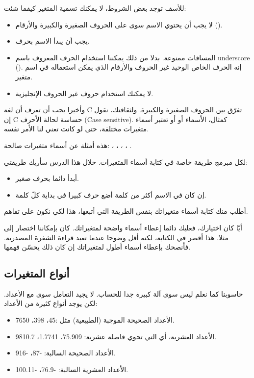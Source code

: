 للأسف توجد بعض الشروط، لا يمكنك تسمية المتغير كيفما شئت:
\begin{itemize}
  \item لا يجب أن يحتوي الاسم سوى على الحروف الصغيرة والكبيرة والأرقام
().
  \item يجب أن يبدأ الاسم بحرف.
  \item المسافات ممنوعة. بدلا من ذلك يمكننا استخدام الحرف المعروف باسم
\textenglish{underscore}
 (\InlineCode{\_}).
إنه الحرف الخاص الوحيد غير الحروف والأرقام الذي يمكن استعماله في اسم متغير.
  \item لا يمكنك استخدام حروف غير الحروف الإنجليزية.
\end{itemize}

وأخيرا يجب أن تعرف أن لغة
\textenglish{C}
 تفرّق بين الحروف الصغيرة والكبيرة. ولثقافتك، نقول إن
\textenglish{C}
 حساسة لحالة الأحرف
(\textenglish{Case sensitive}).
كمثال، الأسماء
 أو
 أو
تعتبر أسماء متغيرات مختلفة، حتى لو كانت تعني لنا الأمر نفسه.

هذه أمثلة عن أسماء متغيرات صالحة:
،
،
،
،
.

لكل مبرمج طريقة خاصة في كتابة أسماء المتغيرات. خلال هذا الدرس سأريك طريقتي:
\begin{itemize}
  \item أبدأ دائما بحرف صغير.
  \item إن كان في الاسم أكثر من كلمة أضع حرف كبيرا في بداية كلّ كلمة.
\end{itemize}

أطلب منك كتابة أسماء متغيراتك بنفس الطريقة التي أتبعها، هذا لكي نكون على تفاهم.

\begin{critical}
  أيّا كان اختيارك، فعليك دائما إعطاء أسماء واضحة لمتغيراتك. كان بإمكاننا اختصار
إلى
مثلا. هذا أقصر في الكتابة، لكنه أقل وضوحا عندما تعيد قراءة الشفرة المصدرية. فأنصحك بإعطاء أسماء أطول لمتغيراتك إن كان ذلك يحسّن فهمها.
\end{critical}

\subsection{أنواع المتغيرات}
حاسوبنا كما نعلم ليس سوى آلة كبيرة جدا للحساب. لا يجيد التعامل سوى مع الأعداد. لكن يوجد أنواع كثيرة من الأعداد:
\begin{itemize}
  \item الأعداد الصحيحة الموجبة (الطبيعية) مثل :45، 398، 7650.
  \item الأعداد العشرية، أي التي تحوي فاصلة عشرية: 75.909، 1.7741، 9810.7.
  \item الأعداد الصحيحة السالبة: -87، -916.
  \item الأعداد العشرية السالبة: -76.9، -100.11.
\end{itemize}


